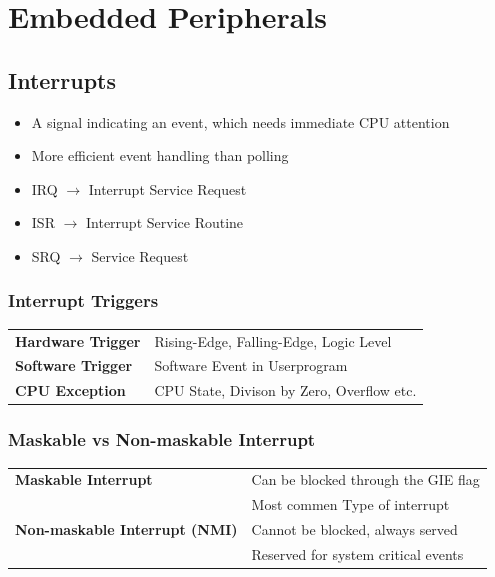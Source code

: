 \section{Embedded Peripherals}
\begin{minipage}{0.4\linewidth}
    \subsection{Interrupts }
    \begin{itemize}
    	\item A signal indicating an event, which needs immediate CPU attention
    	\item More efficient event handling than polling
    	\item IRQ $\rightarrow$ Interrupt Service Request
    	\item ISR $\rightarrow$ Interrupt Service Routine
    	\item SRQ $\rightarrow$ Service Request
    \end{itemize}
\end{minipage}
\begin{minipage}{0.5\linewidth}
    \subsubsection{Interrupt Triggers}
    \begin{tabular}{ll}
    	\textbf{Hardware Trigger}& Rising-Edge, Falling-Edge, Logic Level\\
    	\textbf{Software Trigger}& Software Event in Userprogram\\
    	\textbf{CPU Exception}& CPU State, Divison by Zero, Overflow etc.\\
    \end{tabular}
\end{minipage}

\subsubsection{Maskable vs Non-maskable Interrupt}
\begin{tabular}{ll}
	\textbf{Maskable Interrupt}& Can be blocked through the GIE flag\\
	& Most commen Type of interrupt\\
	\textbf{Non-maskable Interrupt (NMI)}& Cannot be blocked, always served\\
	& Reserved for system critical events\\
\end{tabular}



